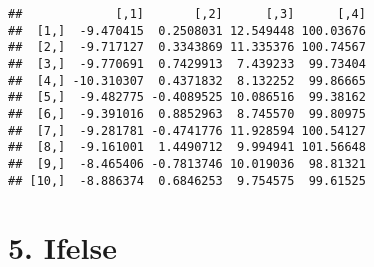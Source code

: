 \documentclass[]{article}
\newenvironment{Shaded}{\begin{snugshade}}{\end{snugshade}}
\newcommand{\CommentTok}[1]{\textcolor[rgb]{0.56,0.35,0.01}{\textit{#1}}}
\newcommand{\DataTypeTok}[1]{\textcolor[rgb]{0.13,0.29,0.53}{#1}}
\newcommand{\DecValTok}[1]{\textcolor[rgb]{0.00,0.00,0.81}{#1}}
\newcommand{\KeywordTok}[1]{\textcolor[rgb]{0.13,0.29,0.53}{\textbf{#1}}}
\newcommand{\NormalTok}[1]{#1}
\newcommand{\OperatorTok}[1]{\textcolor[rgb]{0.81,0.36,0.00}{\textbf{#1}}}
\newcommand{\StringTok}[1]{\textcolor[rgb]{0.31,0.60,0.02}{#1}}
\begin{document}
\begin{verbatim}
##             [,1]       [,2]      [,3]      [,4]
##  [1,]  -9.470415  0.2508031 12.549448 100.03676
##  [2,]  -9.717127  0.3343869 11.335376 100.74567
##  [3,]  -9.770691  0.7429913  7.439233  99.73404
##  [4,] -10.310307  0.4371832  8.132252  99.86665
##  [5,]  -9.482775 -0.4089525 10.086516  99.38162
##  [6,]  -9.391016  0.8852963  8.745570  99.80975
##  [7,]  -9.281781 -0.4741776 11.928594 100.54127
##  [8,]  -9.161001  1.4490712  9.994941 101.56648
##  [9,]  -8.465406 -0.7813746 10.019036  98.81321
## [10,]  -8.886374  0.6846253  9.754575  99.61525
\end{verbatim}

\hypertarget{ifelse}{%
\section{5. Ifelse}\label{ifelse}}

\begin{Shaded}
\end{Shaded}
\end{document}
